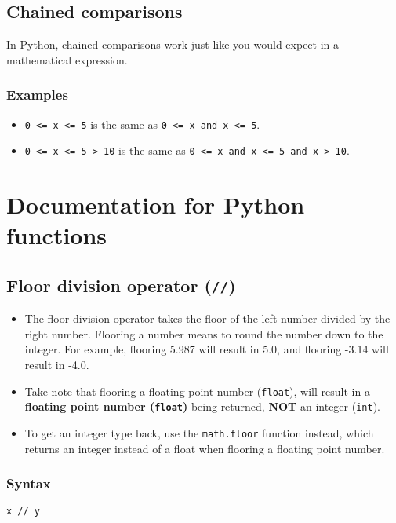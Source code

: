 \documentclass[11pt]{article}
\begin{document}
 \newpage

\subsection{Chained comparisons}
\label{sec:org30cb554}
In Python, chained comparisons work just like you would expect in a mathematical expression.

\subsubsection{Examples}
\label{sec:orgdc5f7e7}
\begin{itemize}
\item \texttt{0 <= x <= 5} is the same as \texttt{0 <= x and x <= 5}.
\item \texttt{0 <= x <= 5 > 10} is the same as \texttt{0 <= x and x <= 5 and x > 10}.
\end{itemize}

 \newpage

\section{Documentation for Python functions}
\label{sec:orgcbe5ca7}

\subsection{Floor division operator (\texttt{//})}
\label{sec:org7055f52}
\begin{itemize}
\item The floor division operator takes the floor of the left number divided by the right number. Flooring a number means to round the number down to the integer. For example, flooring 5.987 will result in 5.0, and flooring -3.14 will result in -4.0.
\item Take note that flooring a floating point number (\texttt{float}), will result in a \textbf{floating point number (\texttt{float})} being returned, \textbf{NOT} an integer (\texttt{int}).
\item To get an integer type back, use the \texttt{math.floor} function instead, which returns an integer instead of a float when flooring a floating point number.
\end{itemize}

\subsubsection{Syntax}
\label{sec:org4cfd3da}
\texttt{x // y}
\end{document}
